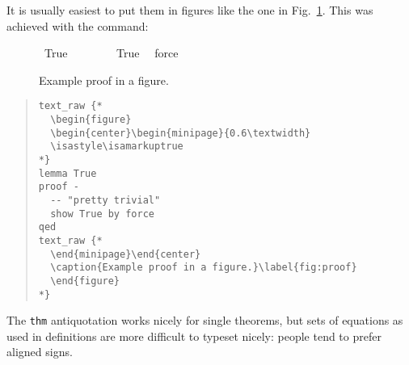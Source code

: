 \begin{isabellebody}
\begin{isamarkuptext}
  It is usually easiest to put them in figures like the one in Fig.\
  \ref{fig:proof}. This was achieved with the 
  command:%
\end{isamarkuptext}%
\isamarkuptrue%
%
\begin{figure}
  \begin{center}\begin{minipage}{0.6\textwidth}  
  \isastyle\isamarkuptrue
{}\ True\isanewline
\isamarkupfalse%
\ {\isacharminus}\isanewline
\ \ %
\isanewline
\ \ \isamarkupfalse%
\ True\ \isamarkupfalse%
\ force\isanewline
\isamarkupfalse%
\isamarkupfalse%
%
\end{minipage}\end{center}
  \caption{Example proof in a figure.}\label{fig:proof}
  \end{figure}
%
\begin{isamarkuptext}%
\begin{quote}
\small
\verb!text_raw {!\verb!*!\\
\verb!  \begin{figure}!\\
\verb!  \begin{center}\begin{minipage}{0.6\textwidth}!\\
\verb!  \isastyle\isamarkuptrue!\\
\verb!*!\verb!}!\\
\verb!lemma True!\\
\verb!proof -!\\
\verb!  -- "pretty trivial"!\\
\verb!  show True by force!\\
\verb!qed!\\
\verb!text_raw {!\verb!*!\\
\verb!  \end{minipage}\end{center}!\\
\verb!  \caption{Example proof in a figure.}\label{fig:proof}!\\
\verb!  \end{figure}!\\
\verb!*!\verb!}!
\end{quote}%
\end{isamarkuptext}%
\isamarkuptrue%
%
\isamarkuptrue%
%
\begin{isamarkuptext}%
The \verb!thm! antiquotation works nicely for single theorems, but
  sets of equations as used in definitions are more difficult to
  typeset nicely: people tend to prefer aligned \isa{{\isacharequal}} signs.


\end{isamarkuptext}
\end{isabellebody}
